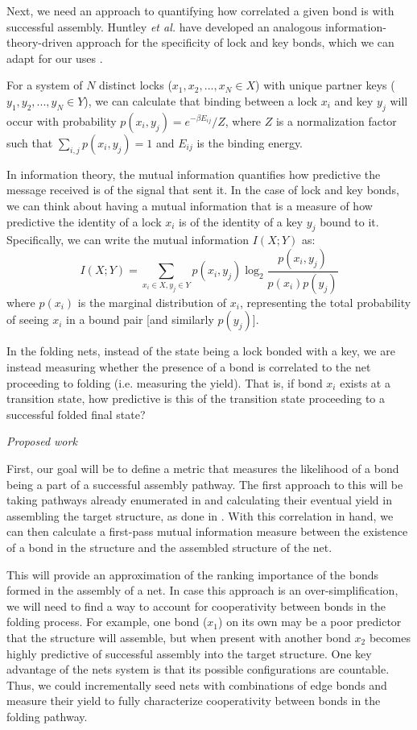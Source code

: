 Next, we need an approach to quantifying how correlated a given bond is with successful assembly.
Huntley \textit{et al.} have developed an analogous information-theory-driven approach for the specificity of lock and key bonds, which we can adapt for our uses \cite{Huntley_2016_PNAS}. 

For a system of $N$ distinct locks ($x_1,x_2,...,x_N\in X$) with unique partner keys ($y_1,y_2,..., y_N \in Y$), we can calculate that binding between a lock $x_i$ and key $y_j$ will occur with probability $p(x_i,y_j)=e^{-{\beta}E_{ij}}/Z$, where $Z$ is a normalization factor such that $\sum_{i,j}p(x_i,y_j)=1$ and $E_{ij}$ is the binding energy.

In information theory, the mutual information quantifies how predictive the message received is of the signal that sent it.
In the case of lock and key bonds, we can think about having a mutual information that is a measure of how predictive the identity of a lock $x_i$ is of the identity of a key $y_j$ bound to it.
Specifically, we can write the mutual information $I(X;Y)$ as:
\begin{equation}
I(X;Y) = \sum_{x_i{\in}X,y_j{\in}Y} p(x_i,y_j)\log_2\frac{p(x_i,y_j)}{p(x_i)p(y_j)}
\end{equation}
where $p(x_i)$ is the marginal distribution of $x_i$, representing the total probability of seeing $x_i$ in a bound pair [and similarly $p(y_j)$].

In the folding nets, instead of the state being a lock bonded with a key, we are instead measuring whether the presence of a bond is correlated to the net proceeding to folding (i.e. measuring the yield).
That is, if bond $x_i$ exists at a transition state, how predictive is this of the transition state proceeding to a successful folded final state?

\textit{Proposed work}

First, our goal will be to define a metric that measures the likelihood of a bond being a part of a successful assembly pathway.
The first approach to this will be taking pathways already enumerated in \cite{Dodd_2018_unpublished} and calculating their eventual yield in assembling the target structure, as done in \cite{Jankowski_2012_SoftMatter}.
With this correlation in hand, we can then calculate a first-pass mutual information measure between the existence of a bond in the structure and the assembled structure of the net.

This will provide an approximation of the ranking importance of the bonds formed in the assembly of a net.
In case this approach is an over-simplification, we will need to find a way to account for cooperativity between bonds in the folding process.
For example, one bond ($x_1$) on its own may be a poor predictor that the structure will assemble, but when present with another bond $x_2$ becomes highly predictive of successful assembly into the target structure.
One key advantage of the nets system is that its possible configurations are countable.
Thus, we could incrementally seed nets with combinations of edge bonds and measure their yield to fully characterize cooperativity between bonds in the folding pathway.

